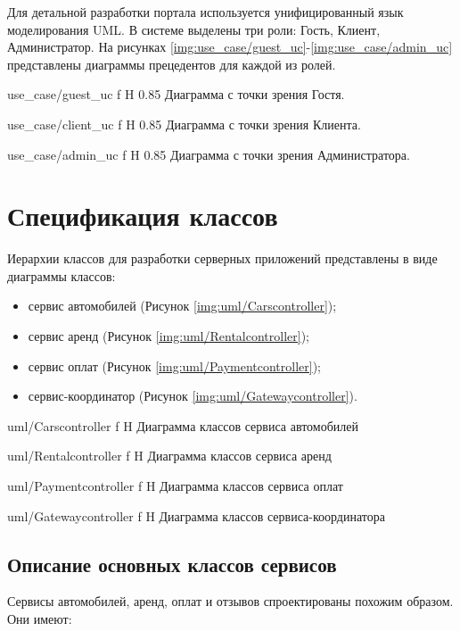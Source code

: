 Для детальной разработки портала используется унифицированный язык моделирования UML. В системе выделены три роли: Гость, Клиент, Администратор. На рисунках \ref{img:use_case/guest_uc}-\ref{img:use_case/admin_uc} представлены диаграммы прецедентов для каждой из ролей.

{use_case/guest_uc}
{f}
{H}
{0.85\textwidth}
{Диаграмма с точки зрения Гостя.}

{use_case/client_uc}
{f}
{H}
{0.85\textwidth}
{Диаграмма с точки зрения Клиента.}


{use_case/admin_uc}
{f}
{H}
{0.85\textwidth}
{Диаграмма с точки зрения Администратора.}

\section{Спецификация классов}

Иерархии классов для разработки серверных приложений представлены в виде диаграммы классов:

\begin{itemize}
	\item сервис автомобилей (Рисунок \ref{img:uml/Carscontroller});
	
	\item сервис аренд (Рисунок \ref{img:uml/Rentalcontroller});
	
	\item сервис оплат (Рисунок \ref{img:uml/Paymentcontroller});
	
	\item сервис-координатор (Рисунок \ref{img:uml/Gatewaycontroller}).
\end{itemize}

{uml/Carscontroller}
{f}
{H}
{\textwidth}
{Диаграмма классов сервиса автомобилей}

{uml/Rentalcontroller}
{f}
{H}
{\textwidth}
{Диаграмма классов сервиса аренд}

{uml/Paymentcontroller}
{f}
{H}
{\textwidth}
{Диаграмма классов сервиса оплат}

{uml/Gatewaycontroller}
{f}
{H}
{\textwidth}
{Диаграмма классов сервиса-координатора}

\subsection*{Описание основных классов сервисов}

Сервисы автомобилей, аренд, оплат и отзывов спроектированы похожим образом. Они имеют:

